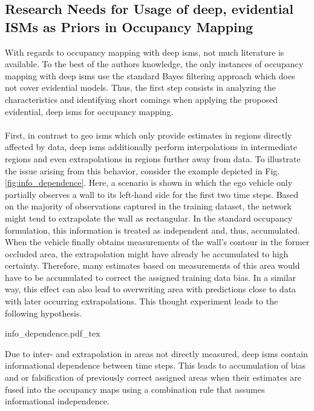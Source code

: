 \subsection{Research Needs for Usage of deep, evidential ISMs as Priors in Occupancy Mapping}
\label{subsec:research_needs_for_usage_of_deep_ims_as_priors_in_occmapping}
With regards to occupancy mapping with deep \gls{ism}s, not much literature is available. To the best of the authors knowledge, the only instances of occupancy mapping with deep \gls{ism}s use the standard Bayes filtering approach which does not cover evidential models. Thus, the first step consists in analyzing the characteristics and identifying short comings when applying the proposed evidential, deep \gls{ism}s for occupancy mapping.
\\\\
First, in contrast to geo \gls{ism}s which only provide estimates in regions directly affected by data, deep \gls{ism}s additionally perform interpolations in intermediate regions and even extrapolations in regions further away from data. To illustrate the issue arising from this behavior, consider the example depicted in Fig. \ref{fig:info_dependence}. Here, a scenario is shown in which the ego vehicle only partially observes a wall to its left-hand side for the first two time steps. Based on the majority of observations captured in the training dataset, the network might tend to extrapolate the wall as rectangular. In the standard occupancy formulation, this information is treated as independent and, thus, accumulated. When the vehicle finally obtains measurements of the wall's contour in the former occluded area, the extrapolation might have already be accumulated to high certainty. Therefore, many estimates based on measurements of this area would have to be accumulated to correct the assigned training data bias. In a similar way, this effect can also lead to overwriting area with predictions close to data with later occurring extrapolations. This thought experiment leads to the following hypothesis.
\begin{center}
	{info_dependence.pdf_tex}
\end{center}
\begin{hyp} \label{hyp:temporal_dependence}
	Due to inter- and extrapolation in areas not directly measured, deep \gls{ism}s contain informational dependence between time steps. This leads to accumulation of bias and or falsification of previously correct assigned areas when their estimates are fused into the occupancy maps using a combination rule that assumes informational independence.  
\end{hyp}
